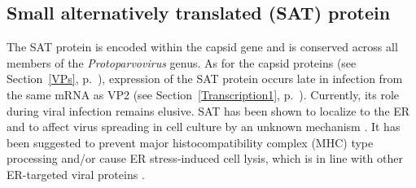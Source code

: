 

\subsection{Small alternatively translated (SAT) protein}
\label{SAT}
The SAT protein is encoded within the capsid gene and is conserved across all members of the \textit{Protoparvovirus} genus.  As for the capsid proteins (see Section~\ref{VPs}, p.~\pageref{VPs}), expression of the SAT protein occurs late in infection from the same mRNA as VP2 (see Section~\ref{Transcription1}, p.~\pageref{Transcription1}). Currently, its role during viral infection remains elusive. SAT has been shown to localize to the ER and to affect virus spreading in cell culture by an unknown mechanism \cite{pmid16189014}. It has been suggested to prevent major histocompatibility complex (MHC) type~ processing \cite{pmid14671122, pmid14738766} and/or cause ER stress-induced cell lysis, which is in line with other ER-targeted viral proteins \cite{pmid14610184, pmid15708603, pmid11932381, pmid14960590}.
  



